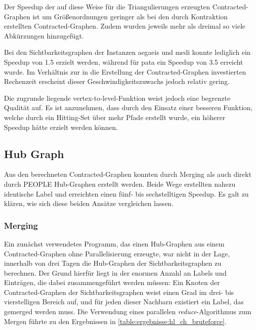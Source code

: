 Der Speedup der auf diese Weise für die Triangulierungen erzeugten Contracted-Graphen ist um Größenordnungen geringer als bei den durch Kontraktion erstellten Contracted-Graphen.
Zudem wurden jeweils mehr als dreimal so viele Abkürzungen hinzugefügt.

Bei den Sichtbarkeitsgraphen der Instanzen aegaeis und medi konnte lediglich ein Speedup von \num{1.5} erzielt werden, während für pata ein Speedup von \num{3.5} erreicht wurde. Im Verhältnis zur in die Erstellung der Contracted-Graphen investierten Rechenzeit erscheint dieser Geschwindigkeitszuwachs jedoch relativ gering.

Die zugrunde liegende vertex-to-level-Funktion weist jedoch eine begrenzte Qualität auf.
Es ist anzunehmen, dass durch den Einsatz einer besseren Funktion, welche durch ein Hitting-Set über mehr Pfade erstellt wurde, ein höherer Speedup hätte erzielt werden können.

\subsection{Hub Graph}

Aus den berechneten Contracted-Graphen konnten durch Merging als auch direkt durch PEOPLE Hub-Graphen erstellt werden.
Beide Wege erstellten nahezu identische Label und erreichten einen fünf- bis sechstelltigen Speedup.
Es galt zu klären, wie sich diese beiden Ansätze vergleichen lassen.

\subsubsection{Merging}

Ein zunächst verwendetes Programm, das einen Hub-Graphen aus einem Contracted-Graphen ohne Parallelisierung erzeugte, war nicht in der Lage, innerhalb von drei Tagen die Hub-Graphen der Sichtbarkeitsgraphen zu berechnen.
Der Grund hierfür liegt in der enormen Anzahl an Labels und Einträgen, die dabei zusammengeführt werden müssen: Ein Knoten der Contracted-Graphen der Sichtbarkeitsgraphen weist einen Grad im drei- bis vierstelligen Bereich auf, und für jeden dieser Nachbarn existiert ein Label, das gemerged werden muss.
Die Verwendung eines parallelen \emph{reduce}-Algorithmus zum Mergen führte zu den Ergebnissen in \autoref{table:ergebnisse:hl_ch_bruteforce}.

